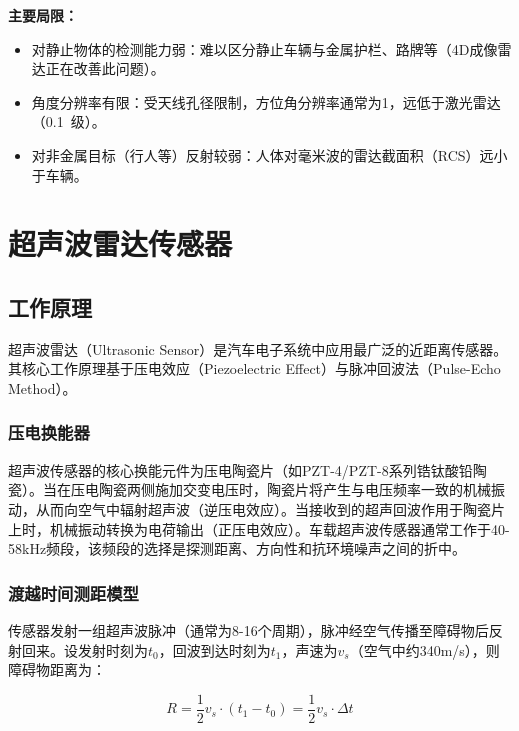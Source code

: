 \documentclass[12pt,a4paper,openany,UTF8]{ctexbook}
\begin{document}
\textbf{主要局限：}
\begin{itemize}
    \item 对静止物体的检测能力弱：难以区分静止车辆与金属护栏、路牌等（4D成像雷达正在改善此问题）。
    \item 角度分辨率有限：受天线孔径限制，方位角分辨率通常为1\textdegree，远低于激光雷达（0.1\textdegree\ 级）。
    \item 对非金属目标（行人等）反射较弱：人体对毫米波的雷达截面积（RCS）远小于车辆。
\end{itemize}

\clearpage

\chapter{超声波雷达传感器}

\section{工作原理}

超声波雷达（Ultrasonic Sensor）是汽车电子系统中应用最广泛的近距离传感器。其核心工作原理基于压电效应（Piezoelectric Effect）与脉冲回波法（Pulse-Echo Method）。

\subsection{压电换能器}

超声波传感器的核心换能元件为压电陶瓷片（如PZT-4/PZT-8系列锆钛酸铅陶瓷）。当在压电陶瓷两侧施加交变电压时，陶瓷片将产生与电压频率一致的机械振动，从而向空气中辐射超声波（逆压电效应）。当接收到的超声回波作用于陶瓷片上时，机械振动转换为电荷输出（正压电效应）。车载超声波传感器通常工作于40-58kHz频段，该频段的选择是探测距离、方向性和抗环境噪声之间的折中。

\subsection{渡越时间测距模型}

传感器发射一组超声波脉冲（通常为8-16个周期），脉冲经空气传播至障碍物后反射回来。设发射时刻为$t_0$，回波到达时刻为$t_1$，声速为$v_s$（空气中约340m/s），则障碍物距离为：

\begin{equation}\label{eq:ultrasonic_range}
R = \frac{1}{2} v_s \cdot (t_1 - t_0) = \frac{1}{2} v_s \cdot \Delta t
\end{equation}
\end{document}
